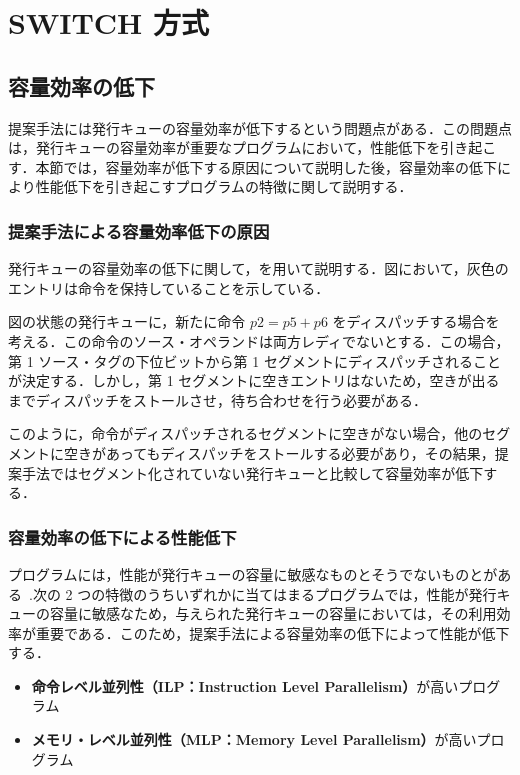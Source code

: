 \chapter{SWITCH 方式}
\label{sec:switch}
\section{容量効率の低下}
\label{sec:occupency_reduction}
提案手法には発行キューの容量効率が低下するという問題点がある．この問題点は，発行キューの容量効率が重要なプログラムにおいて，性能低下を引き起こす．本節では，容量効率が低下する原因について説明した後，容量効率の低下により性能低下を引き起こすプログラムの特徴に関して説明する．

\subsection{提案手法による容量効率低下の原因}
発行キューの容量効率の低下に関して，を用いて説明する．図において，灰色のエントリは命令を保持していることを示している．

図の状態の発行キューに，新たに命令 $p2 = p5 + p6$ をディスパッチする場合を考える．この命令のソース・オペランドは両方レディでないとする．この場合，第 1 ソース・タグの下位ビットから第 1 セグメントにディスパッチされることが決定する．しかし，第 1 セグメントに空きエントリはないため，空きが出るまでディスパッチをストールさせ，待ち合わせを行う必要がある．

このように，命令がディスパッチされるセグメントに空きがない場合，他のセグメントに空きがあってもディスパッチをストールする必要があり，その結果，提案手法ではセグメント化されていない発行キューと比較して容量効率が低下する．

\subsection{容量効率の低下による性能低下}
プログラムには，性能が発行キューの容量に敏感なものとそうでないものとがある~\cite{Ando2019, Kora2013, Sembrant2015}.次の 2 つの特徴のうちいずれかに当てはまるプログラムでは，性能が発行キューの容量に敏感なため，与えられた発行キューの容量においては，その利用効率が重要である．このため，提案手法による容量効率の低下によって性能が低下する．
\begin{itemize}
  \item \textbf{命令レベル並列性（ILP：Instruction Level Parallelism）}が高いプログラム
  \item \textbf{メモリ・レベル並列性（MLP：Memory Level Parallelism）}が高いプログラム 
\end{itemize}

